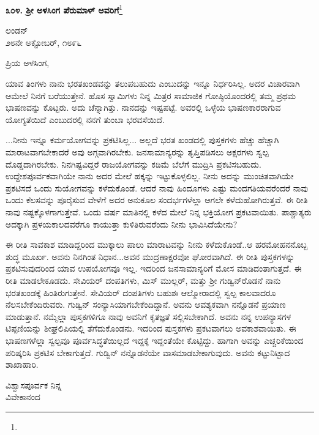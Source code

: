 \begin{center}
\textbf{೩೦೪. ಶ‍್ರೀ ಅಳಸಿಂಗ ಪೆರುಮಾಳ್ ಅವರಿಗೆ}\footnote{}
\end{center}

\begin{flushright}
ಲಂಡನ್\\೨೮ನೇ ಅಕ್ಟೋಬರ್, ೧೮೯೬
\end{flushright}

\noindent
ಪ್ರಿಯ ಅಳಸಿಂಗ,

ಯಾವ ತಿಂಗಳು ನಾನು ಭರತಖಂಡವನ್ನು ತಲುಪಬಹುದು ಎಂಬುದನ್ನು ಇನ್ನೂ ನಿರ್ಧರಿಸಿಲ್ಲ. ಅದರ ವಿಚಾರವಾಗಿ ಆಮೇಲೆ ನಿನಗೆ ಬರೆಯುತ್ತೇನೆ. ಹೊಸ ಸ್ವಾಮಿಗಳು ನಿನ್ನ ಮಿತ್ರರ ಸಾಮಾಜಿಕ ಗೋಷ್ಠಿಯೊಂದರಲ್ಲಿ ತಮ್ಮ ಪ್ರಥಮ ಭಾಷಣವನ್ನು ಕೊಟ್ಟರು. ಅದು ಚೆನ್ನಾಗಿತ್ತು. ನಾನದನ್ನು ಇಷ್ಟಪಟ್ಟೆ. ಅವರಲ್ಲಿ ಒಳ್ಳೆಯ ಭಾಷಣಕಾರರಾಗುವ ಯೋಗ್ಯತೆಯಿದೆ ಎಂಬುದರಲ್ಲಿ ನನಗೆ ತುಂಬಾ ಭರವಸೆಯಿದೆ.

...ನೀನು ಇನ್ನೂ ಕರ್ಮಯೋಗವನ್ನು ಪ್ರಕಟಿಸಿಲ್ಲ... ಅಲ್ಲದೆ ಭರತ ಖಂಡದಲ್ಲಿ ಪುಸ್ತಕಗಳು ಹೆಚ್ಚು ಹೆಚ್ಚಾಗಿ ಮಾರಾಟವಾಗಬೇಕಾದರೆ ಅವು ಅಗ್ಗವಾಗಿರಬೇಕು. ಜನಸಾಮಾನ್ಯರನ್ನು ತೃಪ್ತಿಪಡಿಸಲು ಅಕ್ಷರಗಳು ಸ್ವಲ್ಪ ದೊಡ್ಡದಾಗಿರಬೇಕು. ನಿನಗಿಷ್ಟವಿದ್ದರೆ ರಾಜಯೋಗವನ್ನು ಕಡಿಮೆ ಬೆಲೆಗೆ ಮುದ್ರಿಸಿ ಪ್ರಕಟಿಸಬಹುದು. ಉದ್ದೇಶಪೂರ್ವಕವಾಗಿಯೇ ನಾನು ಅದರ ಮೇಲೆ ಹಕ್ಕನ್ನು ಇಟ್ಟುಕೊಳ್ಳಲಿಲ್ಲ. ನೀನು ಅದನ್ನು ಮುಂಚಿತವಾಗಿಯೇ ಪ್ರಕಟಿಸದೆ ಒಂದು ಸುಯೋಗವನ್ನು ಕಳೆದುಕೊಂಡೆ. ಆದರೆ ನಾವು ಹಿಂದೂಗಳು ಎಷ್ಟು ಮಂದಗತಿಯವರೆಂದರೆ ನಾವು ಒಂದು ಕೆಲಸವನ್ನು ಪೂರೈಸುವ ವೇಳೆಗೆ ಅದರ ಅನುಕೂಲ ಸಂದರ್ಭಗಳೆಲ್ಲಾ ಆಗಲೇ ಕಳೆದುಹೋಗಿರುತ್ತವೆ. ಈ ರೀತಿ ನಾವು ನಷ್ಟಕ್ಕೊಳಗಾಗುತ್ತೇವೆ. ಒಂದು ವರ್ಷ ಮಾತಿನಲ್ಲಿ ಕಳೆದ ಮೇಲೆ ನಿನ್ನ ಭಕ್ತಿಯೋಗ ಪ್ರಕಟವಾಯಿತು. ಪಾಶ್ಚಾತ್ಯರು ಅದಕ್ಕಾಗಿ ಪ್ರಳಯಕಾಲದವರೆಗೂ ಕಾಯುತ್ತಾ ಕುಳಿತಿರುವರೆಂದು ನೀನು ಭಾವಿಸಿದೆಯೇನು?

ಈ ರೀತಿ ಸಾವಕಾಶ ಮಾಡಿದ್ದರಿಂದ ಮುಕ್ಕಾಲು ಪಾಲು ಮಾರಾಟವನ್ನು ನೀನು ಕಳೆದುಕೊಂಡೆ..ಆ ಹರಮೋಹನನೊಬ್ಬ ಶುದ್ಧ ಮೂರ್ಖ. ಅವನು ನಿನಗಿಂತ ನಿಧಾನ...ಅವನ ಮುದ್ರಣಾಕ್ಷರವೋ ಘೋರವಾಗಿದೆ. ಈ ರೀತಿ ಪುಸ್ತಕಗಳನ್ನು ಪ್ರಕಟಿಸುವುದರಿಂದ ಯಾವ ಉಪಯೋಗವೂ ಇಲ್ಲ. ಇದರಿಂದ ಜನಸಾಮಾನ್ಯರಿಗೆ ಮೋಸ ಮಾಡಿದಂತಾಗುತ್ತದೆ. ಈ ರೀತಿ ಮಾಡಲೇಕೂಡದು. ಸೇವಿಯರ್ ದಂಪತಿಗಳು, ಮಿಸ್ ಮುಲ್ಲರ್, ಮತ್ತು ಶ‍್ರೀ ಗುಡ್ವಿನ್‌ರೊಡನೆ ನಾನು ಭರತಖಂಡಕ್ಕೆ ಹಿಂತಿರುಗುತ್ತೇನೆ. ಸೇವಿಯರ್ ದಂಪತಿಗಳು ಬಹುಶಃ ಆಲ್ಮೋರಾದಲ್ಲಿ ಸ್ವಲ್ಪ ಕಾಲವಾದರೂ ನೆಲಸಬೇಕೆಂದಿರುವರು. ಗುಡ್ವಿನ್ ಸಂನ್ಯಾಸಿಯಾಗಬೇಕೆಂದಿದ್ದಾನೆ. ಅವನು ಆವಶ್ಯಕವಾಗಿ ನನ್ನೊಡನೆ ಪ್ರಯಾಣ ಮಾಡುತ್ತಾನೆ. ನಮ್ಮೆಲ್ಲಾ ಪುಸ್ತಕಗಳಿಗೂ ನಾವು ಅವನಿಗೆ ಕೃತಜ್ಞತೆ ಸಲ್ಲಿಸಬೇಕಾಗಿದೆ. ಅವನು ನನ್ನ ಉಪನ್ಯಾಸಗಳ ಟಿಪ್ಪಣಿಯನ್ನು ಶೀಘ್ರಲಿಪಿಯಲ್ಲಿ ತೆಗೆದುಕೊಂಡನು. ಇದರಿಂದ ಪುಸ್ತಕಗಳು ಪ್ರಕಟವಾಗಲು ಅವಕಾಶವಾಯಿತು. ಈ ಭಾಷಣಗಳೆಲ್ಲಾ ಸ್ವಲ್ಪವೂ ಪೂರ್ವಸಿದ್ಧತೆಯಿಲ್ಲದೆ ಇದ್ದಕ್ಕೆ ಇದ್ದಂತೆಯೇ ಕೊಟ್ಟಿದ್ದು. ಹಾಗಾಗಿ ಅವನ್ನು ಎಚ್ಚರಿಕೆಯಿಂದ ಪರಿಷ್ಕರಿಸಿ ಪ್ರಕಟಿಸ ಬೇಕಾಗುತ್ತದೆ. ಗುಡ್ವಿನ್ ನನ್ನೊಡನೆಯೇ ವಾಸಮಾಡಬೇಕಾಗುವುದು. ಅವನು ಕಟ್ಟುನಿಟ್ಟಾದ ಶಾಖಾಹಾರಿ.

\begin{flushright}
ವಿಶ್ವಾಸಪೂರ್ವಕ ನಿನ್ನ\\ವಿವೇಕಾನಂದ
\end{flushright}


